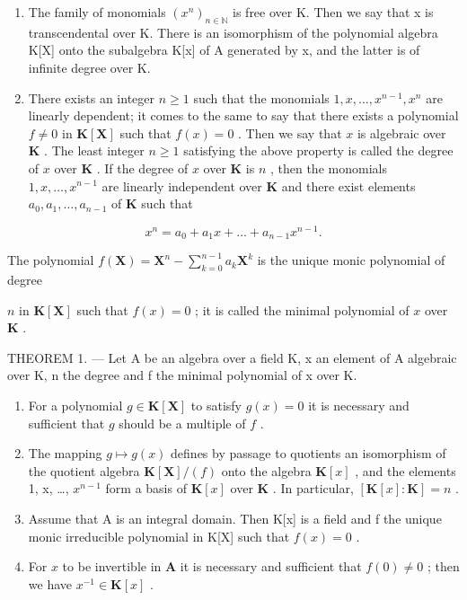 \begin{enumerate}
\def\labelenumi{\alph{enumi})}
\item
  The family of monomials \((x^{n})_{n\in\mathbb{N}}\) is free over K. Then we say that x is transcendental over K. There is an isomorphism of the polynomial algebra K{[}X{]} onto the subalgebra K{[}x{]} of A generated by x, and the latter is of infinite degree over K.
\item
  There exists an integer \(n \geqslant 1\) such that the monomials \(1, x, \ldots, x^{n-1}, x^n\) are linearly dependent; it comes to the same to say that there exists a polynomial \(f \neq 0\) in \(\mathbf{K}[\mathbf{X}]\) such that \(f(x) = 0\) . Then we say that \(x\) is algebraic over \(\mathbf{K}\) . The least integer \(n \geqslant 1\) satisfying the above property is called the degree of \(x\) over \(\mathbf{K}\) . If the degree of \(x\) over \(\mathbf{K}\) is \(n\) , then the monomials \(1, x, \ldots, x^{n-1}\) are linearly independent over \(\mathbf{K}\) and there exist elements \(a_0, a_1, \ldots, a_{n-1}\) of \(\mathbf{K}\) such that
\end{enumerate}

\[
x ^ {n} = a _ {0} + a _ {1} x + \dots + a _ {n - 1} x ^ {n - 1}.
\]

The polynomial \(f(\mathbf{X}) = \mathbf{X}^n - \sum_{k=0}^{n-1} a_k \mathbf{X}^k\) is the unique monic polynomial of degree

\(n\) in \(\mathbf{K}[\mathbf{X}]\) such that \(f(x) = 0\) ; it is called the minimal polynomial of \(x\) over \(\mathbf{K}\) .

THEOREM 1. --- Let A be an algebra over a field K, x an element of A algebraic over K, n the degree and f the minimal polynomial of x over K.

\begin{enumerate}
\def\labelenumi{\alph{enumi})}
\item
  For a polynomial \(g \in \mathbf{K}[\mathbf{X}]\) to satisfy \(g(x) = 0\) it is necessary and sufficient that \(g\) should be a multiple of \(f\) .
\item
  The mapping \(g \mapsto g(x)\) defines by passage to quotients an isomorphism of the quotient algebra \(\mathbf{K}[\mathbf{X}] / (f)\) onto the algebra \(\mathbf{K}[x]\) , and the elements 1, x, \ldots, \(x^{n-1}\) form a basis of \(\mathbf{K}[x]\) over \(\mathbf{K}\) . In particular, \([\mathbf{K}[x]: \mathbf{K}] = n\) .
\item
  Assume that A is an integral domain. Then K{[}x{]} is a field and f the unique monic irreducible polynomial in K{[}X{]} such that \(f(x) = 0\) .
\item
  For \(x\) to be invertible in \(\mathbf{A}\) it is necessary and sufficient that \(f(0) \neq 0\) ; then we have \(x^{-1} \in \mathbf{K}[x]\) .
\end{enumerate}

